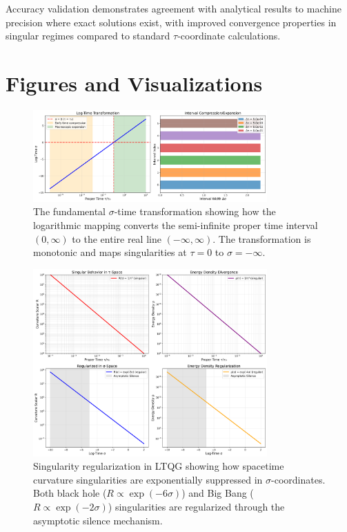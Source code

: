\documentclass[12pt,a4paper]{article}
\begin{document}
Accuracy validation demonstrates agreement with analytical results to machine precision where exact solutions exist, with improved convergence properties in singular regimes compared to standard $\tau$-coordinate calculations.

\section{Figures and Visualizations}

\begin{figure}[H]
\centering
\includegraphics[width=0.8\textwidth]{figs/log_time_map.png}
\caption{The fundamental $\sigma$-time transformation showing how the logarithmic mapping converts the semi-infinite proper time interval $(0, \infty)$ to the entire real line $(-\infty, \infty)$. The transformation is monotonic and maps singularities at $\tau = 0$ to $\sigma = -\infty$.}
\label{fig:log_time_map}
\end{figure}

\begin{figure}[H]
\centering
\includegraphics[width=0.8\textwidth]{figs/singularity_regularization.png}
\caption{Singularity regularization in LTQG showing how spacetime curvature singularities are exponentially suppressed in $\sigma$-coordinates. Both black hole ($R \propto \exp(-6\sigma)$) and Big Bang ($R \propto \exp(-2\sigma)$) singularities are regularized through the asymptotic silence mechanism.}
\label{fig:singularity_regularization}
\end{figure}
\end{document}

